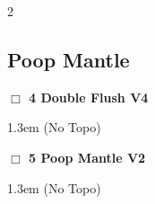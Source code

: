 \begin{multicols}{2}
\subsection*{Poop Mantle}\label{bf:Poop Mantle}
\needspace{2em}
\label{rt:Double Flush}
\colorbox{RoyalBlue!20}{
\parbox{0.95\linewidth}{
\hspace{-1ex}\textbf{$\Box$
4 Double Flush V4  
}}}
\begin{adjustwidth}{1.3em}{}			
  (No Topo)
\end{adjustwidth}
\needspace{2em}
\label{rt:Poop Mantle}
\colorbox{green!20}{
\parbox{0.95\linewidth}{
\hspace{-1ex}\textbf{$\Box$
5 Poop Mantle V2  
}}}
\begin{adjustwidth}{1.3em}{}			
  (No Topo)
\end{adjustwidth}
\end{multicols}
\clearpage